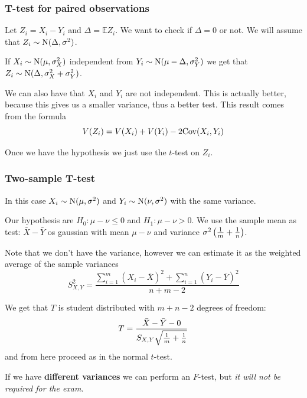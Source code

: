 \documentclass[12pt]{extarticle}
\newcommand{\cov}{{\operatorfont Cov}}
\newcommand{\Normal}{{\operatorfont N}}
\begin{document}
\subsubsection{T-test for paired observations}

Let $Z_i = X_i - Y_i$ and $\Delta = \mathbb E Z_i$.
We want to check if $\Delta = 0$ or not.
We will assume that $Z_i \sim \Normal(\Delta, \sigma^2)$.

If $X_i \sim \Normal(\mu, \sigma_X^2)$ independent from $Y_i \sim \Normal(\mu - \Delta, \sigma_Y^2)$
we get that $Z_i \sim \Normal(\Delta, \sigma_X^2 + \sigma_Y^2)$.

We can also have that $X_i$ and $Y_i$ are not independent.
This is actually better, because this gives us a smaller variance, thus a better test.
This result comes from the formula
\begin{equation}
    V(Z_i) = V(X_i) + V(Y_i) - 2 \cov (X_i, Y_i)
\end{equation}

Once we have the hypothesis we just use the $t$-test on $Z_i$.

\subsubsection{Two-sample T-test}

In this case $X_i \sim \Normal(\mu, \sigma^2)$ and $Y_i \sim \Normal(\nu, \sigma^2)$
with the same variance.

Our hypothesis are $H_0 : \mu - \nu \leq 0$ and $H_1 : \mu - \nu > 0$.
We use the sample mean as test: $\bar X- \bar Y$ os gaussian with mean $\mu - \nu$
and variance $\sigma^2 \left(\frac{1}{m} + \frac{1}{n}\right)$.

Note that we don't have the variance, however we can estimate it as the weighted average of the sample variances
\begin{equation}
    S^2_{X, Y} = \frac{\sum^m_{i = 1} (X_i - \bar X)^2 + \sum^n_{i = 1} (Y_i - \bar Y)^2 }{n + m - 2}
\end{equation}

We get that $T$ is student distributed with $m + n - 2$ degrees of freedom:
\begin{equation}
    T = \frac{\bar X - \bar Y - 0}{S_{X, Y} \sqrt{\frac{1}{m} + \frac{1}{n}}}
\end{equation}
and from here proceed as in the normal $t$-test.

If we have \textbf{different variances} we can perform an $F$-test, but \emph{it will not be required for the exam}.
\end{document}
